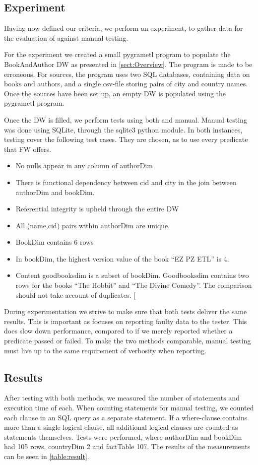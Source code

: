 \subsection{Experiment}
Having now defined our criteria, we perform an experiment, to gather data for the evaluation of \FW{} against manual testing. 

For the experiment we created a small pygrametl program to populate the BookAndAuthor DW as presented in \cref{sect:Overview}. The program is made to be erroneous. For sources, the program uses two SQL databases, containing data on books and authors, and a single csv-file storing pairs of city and country names.  Once the sources have been set up, an empty DW is populated using the pygrametl program. 

Once the DW is filled, we perform tests using both  \FW{} and manual.  Manual testing was done using SQLite, through the sqlite3 python module. In both instances, testing  cover the following test cases. They are chosen, as to use every predicate that FW{} offers.

\begin{itemize}
\item No nulls appear in any column of authorDim
\item There is functional dependency between cid and city in the join between authorDim and bookDim. 
\item Referential integrity is upheld through the entire DW
\item All (name,cid) pairs within authorDim are unique.
\item BookDim contains 6 rows
\item In bookDim, the highest version value of the book “EZ PZ ETL” is 4.
\item Content goodbooksdim is a subset of bookDim. Goodbooksdim contains two rows for the books “The Hobbit” and “The Divine Comedy”. The comparison should not take account of duplicates.
[\end{itemize}

During experimentation we strive to make sure that both tests deliver the same results.  This is important as \FW{} focuses on reporting faulty data to the tester. This does slow down performance, compared to if we merely reported whether a predicate passed or failed. To make the two methods comparable, manual testing must live up to the same requirement of verbosity when reporting.

\subsection{Results}
After testing with both methods, we measured the number of statements and execution time of each. When counting statements for manual testing, we counted each clause in an SQL query as a separate statement. If a where-clause contains more than a single logical clause, all additional logical clauses are counted as statements themselves.  Tests were performed, where authorDim and bookDim had 105 rows, countryDim 2 and factTable 107. The results of the measurements can be seen in \cref{table:result}.

